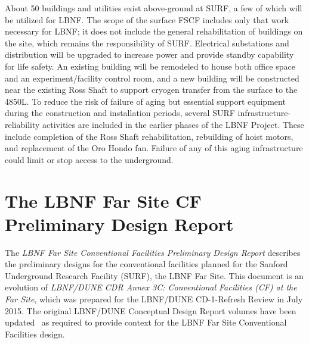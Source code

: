 About 50 buildings and utilities exist above-ground at SURF, a few of which will be utilized for LBNF. 
The scope of the surface FSCF includes only that work necessary for LBNF; it does not include the general rehabilitation of buildings on the site, which remains the responsibility of SURF. Electrical substations and distribution will be upgraded to increase power and provide standby capability for life safety. %
An existing building will be remodeled to house both office space and an experiment/facility control room, and a new building will be constructed near the existing Ross Shaft to support cryogen transfer from the surface to the 4850L. To reduce the risk of failure of aging but essential support equipment during the construction and installation periods, several SURF infrastructure-reliability activities are included in the earlier phases %
of the LBNF Project. These include completion of the Ross Shaft rehabilitation, rebuilding of hoist motors, and replacement of the Oro Hondo fan. Failure of any of this aging infrastructure could limit or stop access to the underground.


\section{The LBNF Far Site CF Preliminary Design Report}
\label{sec:pdr-org-fscf}

The \textit{LBNF Far Site Conventional Facilities Preliminary Design Report} describes the preliminary designs for the conventional facilities planned for the Sanford Underground Research Facility (SURF), the LBNF Far Site. This document is an evolution of \textit{LBNF/DUNE CDR Annex 3C: Conventional Facilities (CF) at the Far Site}, which was prepared for the LBNF/DUNE CD-1-Refresh Review in July 2015. 
The original LBNF/DUNE Conceptual Design Report volumes have been updated~\cite{design-doc-lbnf-dune, design-doc-dune-physics, design-doc-lbnf, design-doc-dune-det}  as required to provide context for the LBNF Far Site Conventional Facilities design.


